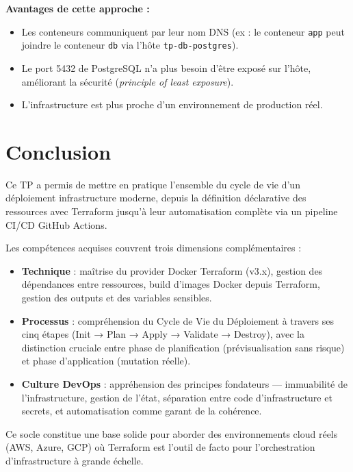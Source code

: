 \documentclass[12pt,a4paper]{report}
\begin{document}
\noindent\textbf{Avantages de cette approche :}
\begin{itemize}
  \item Les conteneurs communiquent par leur nom DNS (ex : le conteneur \texttt{app}
        peut joindre le conteneur \texttt{db} via l'hôte \texttt{tp-db-postgres}).
  \item Le port 5432 de PostgreSQL n'a plus besoin d'être exposé sur l'hôte,
        améliorant la sécurité (\textit{principle of least exposure}).
  \item L'infrastructure est plus proche d'un environnement de production réel.
\end{itemize}

\chapter*{Conclusion}

Ce TP a permis de mettre en pratique l'ensemble du cycle de vie d'un déploiement
infrastructure moderne, depuis la définition déclarative des ressources avec Terraform
jusqu'à leur automatisation complète via un pipeline CI/CD GitHub Actions.

\vspace{0.5em}
\noindent Les compétences acquises couvrent trois dimensions complémentaires :

\begin{itemize}
  \item \textbf{Technique} : maîtrise du provider Docker Terraform (v3.x), gestion des
        dépendances entre ressources, build d'images Docker depuis Terraform, gestion
        des outputs et des variables sensibles.

  \item \textbf{Processus} : compréhension du Cycle de Vie du Déploiement à travers
        ses cinq étapes (Init → Plan → Apply → Validate → Destroy), avec la distinction
        cruciale entre phase de planification (prévisualisation sans risque) et phase
        d'application (mutation réelle).

  \item \textbf{Culture DevOps} : appréhension des principes fondateurs --- immuabilité
        de l'infrastructure, gestion de l'état, séparation entre code d'infrastructure
        et secrets, et automatisation comme garant de la cohérence.
\end{itemize}

\vspace{0.5em}
\noindent Ce socle constitue une base solide pour aborder des environnements cloud
réels (AWS, Azure, GCP) où Terraform est l'outil de facto pour l'orchestration
d'infrastructure à grande échelle.
\end{document}
